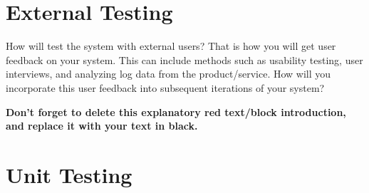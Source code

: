 \section{External Testing} %

\begin{tcolorbox}[      %
    boxrule=0pt,        %
    colback=white,      %
    coltext=red         %
]                       %
    How will test the system with external users? That is how you will get user feedback on your system. This can include methods such as usability testing, user interviews, and analyzing log data from the product/service. How will you incorporate this user feedback into subsequent iterations of your system?
    
    \vspace{15pt}       %
    \begin{center}      %
    \textbf{Don't forget to delete this explanatory red text/block introduction, and replace it with your text in black.}
    \end{center}        %
\end{tcolorbox}         %

\section{Unit Testing} %


